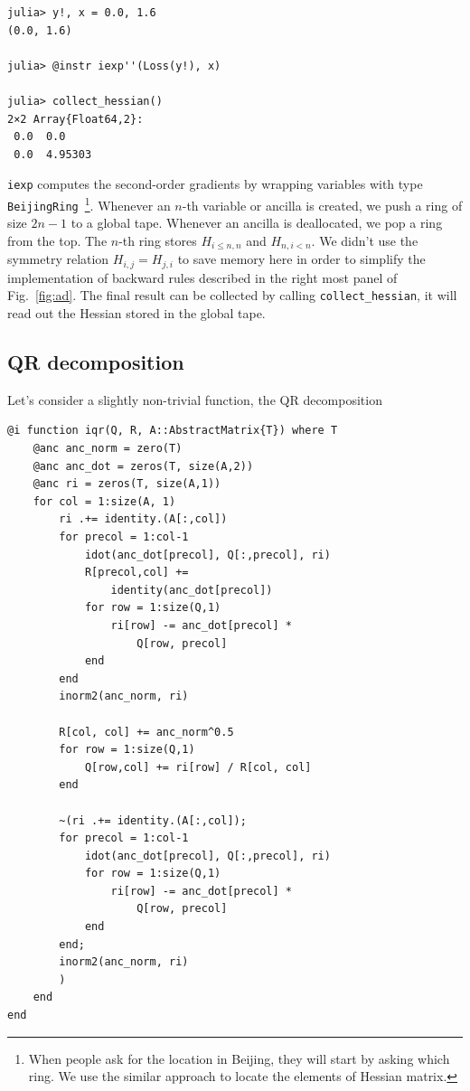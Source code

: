 \documentclass[aps,twocolumn,longbibliography,english,superscriptaddress]{revtex4-1}
\newcommand{\<}{\langle}
\renewcommand{\>}{\rangle}
\newcommand{\Fig}[1]{Fig.~\ref{#1}}
\theoremstyle{definition}\newtheorem{definition}{\textit{Definition}}
\begin{document}
\begin{minipage}{.44\textwidth}
\begin{lstlisting}
julia> y!, x = 0.0, 1.6
(0.0, 1.6)

julia> @instr iexp''(Loss(y!), x)

julia> collect_hessian()
2×2 Array{Float64,2}:
 0.0  0.0
 0.0  4.95303
\end{lstlisting}
\end{minipage}

\texttt{iexp\textquotesingle\textquotesingle} computes the second-order gradients by wrapping variables with type \texttt{BeijingRing}~\footnote{When people ask for the location in Beijing, they will start by asking which ring. We use the similar approach to locate the elements of Hessian matrix.}.
Whenever an $n$-th variable or ancilla is created, we push a ring of size $2n-1$ to a global tape. Whenever an ancilla is deallocated, we pop a ring from the top. The $n$-th ring stores $H_{i\leq n,n}$ and $H_{n,i<n}$. We didn't use the symmetry relation $H_{i,j} = H_{j,i}$ to save memory here in order to simplify the implementation of backward rules described in the right most panel of \Fig{fig:ad}.
The final result can be collected by calling \texttt{collect\_hessian}, it will read out the Hessian stored in the global tape.

\subsection{QR decomposition}

Let's consider a slightly non-trivial function, the QR decomposition

\begin{minipage}{.44\textwidth}
\begin{lstlisting}
@i function iqr(Q, R, A::AbstractMatrix{T}) where T
    @anc anc_norm = zero(T)
    @anc anc_dot = zeros(T, size(A,2))
    @anc ri = zeros(T, size(A,1))
    for col = 1:size(A, 1)
        ri .+= identity.(A[:,col])
        for precol = 1:col-1
            idot(anc_dot[precol], Q[:,precol], ri)
            R[precol,col] +=
                identity(anc_dot[precol])
            for row = 1:size(Q,1)
                ri[row] -= anc_dot[precol] *
                    Q[row, precol]
            end
        end
        inorm2(anc_norm, ri)

        R[col, col] += anc_norm^0.5
        for row = 1:size(Q,1)
            Q[row,col] += ri[row] / R[col, col]
        end

        ~(ri .+= identity.(A[:,col]);
        for precol = 1:col-1
            idot(anc_dot[precol], Q[:,precol], ri)
            for row = 1:size(Q,1)
                ri[row] -= anc_dot[precol] *
                    Q[row, precol]
            end
        end;
        inorm2(anc_norm, ri)
        )
    end
end
\end{lstlisting}
\end{minipage}
\end{document}

